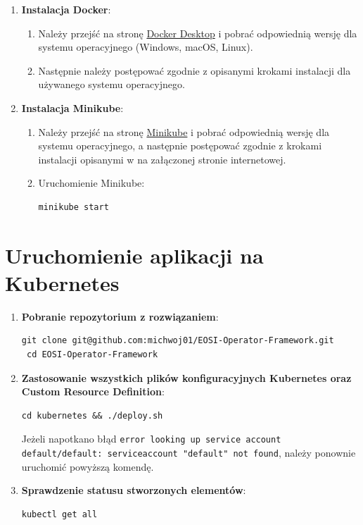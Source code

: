 \documentclass[polish]{aghengthesis}
\begin{document}
\begin{enumerate}
  \item \textbf{Instalacja Docker}:
  \begin{enumerate}
    \item Należy przejść na stronę \href{https://www.docker.com/products/docker-desktop}{Docker Desktop} i pobrać odpowiednią wersję dla systemu operacyjnego (Windows, macOS, Linux).
    \item Następnie należy postępować zgodnie z opisanymi krokami instalacji dla używanego systemu operacyjnego.
  \end{enumerate}
  \item \textbf{Instalacja Minikube}:
  \begin{enumerate}
    \item Należy przejść na stronę \href{https://minikube.sigs.k8s.io/docs/start/}{Minikube} i pobrać odpowiednią wersję dla systemu operacyjnego, a następnie postępować zgodnie z krokami instalacji opisanymi w na załączonej stronie internetowej.
    \item Uruchomienie Minikube:
\begin{lstlisting}[basicstyle=\ttfamily, numbers=none]
minikube start\end{lstlisting}\vspace{-20pt}
  \end{enumerate}
\end{enumerate}

\section{Uruchomienie aplikacji na Kubernetes}

\begin{enumerate}
  \item \textbf{Pobranie repozytorium z rozwiązaniem}:
  \begin{lstlisting}[basicstyle=\ttfamily, numbers=none]
 git clone git@github.com:michwoj01/EOSI-Operator-Framework.git
 cd EOSI-Operator-Framework\end{lstlisting}\vspace{-20pt}
  \item \textbf{Zastosowanie wszystkich plików konfiguracyjnych Kubernetes oraz Custom Resource Definition}:
  \begin{lstlisting}[basicstyle=\ttfamily, numbers=none]
 cd kubernetes && ./deploy.sh\end{lstlisting}\vspace{-20pt}
  Jeżeli napotkano błąd \texttt{error looking up service account default/default: serviceaccount "default" not found}, należy ponownie uruchomić powyższą komendę.
  \item \textbf{Sprawdzenie statusu stworzonych elementów}:
  \begin{lstlisting}[basicstyle=\ttfamily, numbers=none]
kubectl get all\end{lstlisting}\vspace{-20pt}
\end{enumerate}
\end{document}
